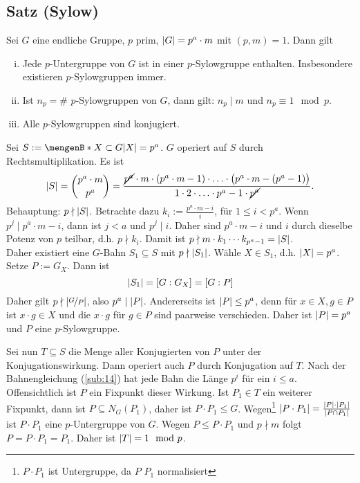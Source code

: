 \subsection{Satz (Sylow)} %
\label{sub:18}
Sei $G$ eine endliche Gruppe, $p$ prim, $\abs*{G} = p^a \cdot m $ mit $(p,m) = 1$. Dann gilt
\begin{enumerate}[(i)]
	\item Jede $p$-Untergruppe von $G$ ist in einer $p$-Sylowgruppe enthalten. Insbesondere existieren $p$-Sylowgruppen immer.
	\item Ist $n_p = \#$ $p$-Sylowgruppen von $G$, dann gilt: $n_p \mid m$ und $n_p \equiv 1 \mod p$.
	\item Alle $p$-Sylowgruppen sind konjugiert.
\end{enumerate}
Sei $S := \set[X \subset G]{ \abs*{X} = p^a } $. $G$ operiert auf $S$ durch Rechtsmultiplikation. Es ist
\[
	\abs*{S} = \binom{p^a \cdot m}{p^a} = \frac{\cancel{p^a} \cdot m \cdot  (p^a \cdot m -1) \cdot \ldots \cdot \big(p^a \cdot m - (p^a -1)\big)}{1 \cdot 2 \cdot \ldots 
	\cdot p^a -1 \cdot \cancel{p^a}}.  
\]
Behauptung: $p \nmid \abs*{S} $. Betrachte dazu $k_i := \frac{p^a \cdot m -i}{i}$, für $1 \le i < p^a$. Wenn $p^j \mid p^a \cdot m -i$, dann ist $j < a$ und $p^j \mid i$.
Daher sind $p^a \cdot m -i$ und $i$ durch dieselbe Potenz von $p$ teilbar, d.h. $p \nmid k_i$. Damit ist $p \nmid m \cdot k_1 \cdots k_{p^a-1} = \abs*{S}$.\\
Daher existiert eine $G$-Bahn $S_1 \subseteq S$ mit $p \nmid \abs*{S_1} $. Wähle $X \in S_1$, d.h. $\abs*{X}= p^a$. Setze $P := G_X$. Dann ist 
\[
	\abs*{S_1} = [G: G_X] = [G: P] 
\]
Daher gilt $p \nmid \abs*{\nicefrac{G}{P}}$, also $p^a \mid \abs*{P}$. Andererseits ist $\abs*{P} \le p^a$, denn für $x \in X, g \in P$ ist $x \cdot g \in X$ und die 
$x \cdot g$ für $g \in P$ sind paarweise verschieden. Daher ist $\abs*{P} = p^a $ und $P$ eine $p$-Sylowgruppe. 

Sei nun $T \subseteq S$ die Menge aller Konjugierten von $P$ unter der Konjugationswirkung. Dann operiert auch $P$ durch Konjugation auf $T$. Nach der Bahnengleichung
(\ref{sub:14}) hat 
jede Bahn die Länge $p^i$ für ein $i \le a$. Offensichtlich ist $P$ ein Fixpunkt dieser Wirkung. Ist $P_1 \in T$ ein weiterer Fixpunkt, dann ist 
$P \subseteq N_G(P_1)$, daher ist $P \cdot  P_1 \le G$. Wegen\footnote{$P \cdot P_1$ ist Untergruppe, da $P$ $P_1$ normalisiert} 
$\abs*{P \cdot P_1} = \frac{\abs*{P} \cdot \abs*{P_1}}{\abs*{P \cap P_1} }$ ist $P \cdot P_1$ eine $p$-Untergruppe von $G$. Wegen $P \le P \cdot P_1$ und $p \nmid m$ folgt
$P= P \cdot P_1 = P_1$. Daher ist $\abs*{T} = 1 \mod p $. 

